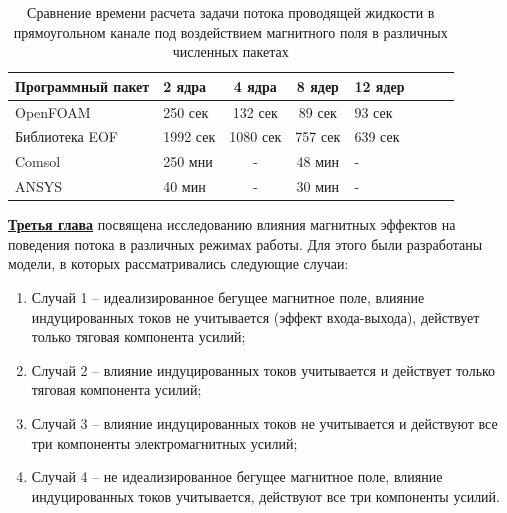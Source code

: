 \begin{table}
	\centering
	\captionsetup{justification=centering}
	\caption{Сравнение времени расчета задачи потока проводящей жидкости в прямоугольном канале под воздействием магнитного поля в различных численных пакетах}
	\begin{tabular}{llccllcc}
		\toprule	
			Программный пакет & 2 ядра        & 4 ядра       & 8  ядер    & 12   ядер  \\
			\midrule
			OpenFOAM                       & 250 сек  & 132 сек  & 89 сек  & 93 сек  \\ \hline
			Библиотека EOF                 & 1992 сек & 1080 сек & 757 сек & 639 сек \\ \hline
			Comsol                         & 250  мни & -        & 48 мин  & -       \\ \hline
			ANSYS                          & 40 мин   & -        & 30 мин  & -       \\ \hline
	\end{tabular}
\label{tab:comparision}
\end{table}



\underline{\textbf{Третья глава}} посвящена исследованию влияния магнитных эффектов на поведения потока в различных режимах работы. Для этого были разработаны модели, в которых рассматривались следующие случаи:

\begin{enumerate}
    \item Случай 1 -- идеализированное бегущее магнитное поле, влияние индуцированных токов не учитывается (эффект входа-выхода), действует только тяговая компонента усилий;
    \item Случай 2 --  влияние индуцированных токов учитывается и действует только тяговая компонента усилий;
    \item Случай 3 -- влияние индуцированных токов не учитывается и действуют все три компоненты электромагнитных усилий;
    \item Случай 4 -- не идеализированное бегущее магнитное поле, влияние индуцированных токов учитывается, действуют все три компоненты усилий. 
\end{enumerate}

